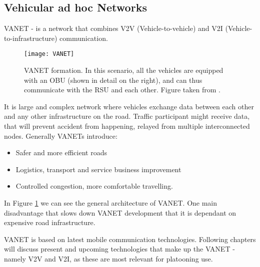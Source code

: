 \subsection{Vehicular ad hoc Networks}

\acrshort{VANET} - is a network that combines \acrshort{V2V} (Vehicle-to-vehicle) and \acrshort{V2I} (Vehicle-to-infrastructure) communication.\par
% 
\begin{figure}[ht]
\texttt{[image: VANET]}
\caption{\acrshort{VANET} formation. In this scenario, all the vehicles are equipped with an \acrshort{OBU} (shown in detail on the right), and can thus communicate with the \acrshort{RSU} and each other. Figure taken from \cite{Jia2016ASystems}.}
\label{fig:VANETformation}
\end{figure}
% 
It is large and complex network where vehicles exchange data between each other and any other infrastructure on the road. Traffic participant might receive data, that will prevent accident from happening, relayed from multiple interconnected nodes. Generally \acrshort{VANET}s introduce:

\begin{itemize}[noitemsep,nolistsep]
    \item Safer and more efficient roads
    \item Logistics, transport and service business improvement
    \item Controlled congestion, more comfortable travelling.
\end{itemize}

In Figure \ref{fig:VANETformation} we can see the general architecture of \acrshort{VANET}. One main disadvantage that slows down VANET development that it is dependant on expensive road infrastructure\footnotemark.\par
% 
% 
\acrshort{VANET} is based on latest mobile communication technologies. Following chapters will discuss present and upcoming technologies that make up the VANET - namely \acrshort{V2V} and \acrshort{V2I}, as these are most relevant for platooning use.
